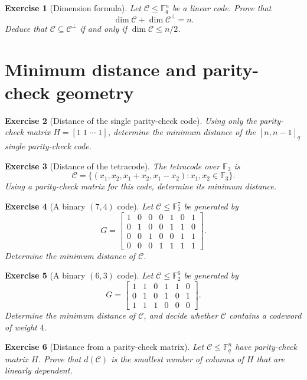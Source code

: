 \documentclass[11pt]{amsbook}
\theoremstyle{exstyle}
\newtheorem{exercise}{Exercise}
\theoremstyle{plain}
\newcommand{\F}{\mathbb{F}}
\newcommand{\Ccal}{\mathcal{C}}
\begin{document}
\begin{exercise}[Dimension formula]
Let $\Ccal\leq\F_q^n$ be a linear code. Prove that
\[
\dim \Ccal+\dim \Ccal^{\perp}=n.
\]
Deduce that $\Ccal\subseteq \Ccal^{\perp}$ if and only if $\dim \Ccal\leq n/2$.
\end{exercise}

\section{Minimum distance and parity-check geometry}

\begin{exercise}[Distance of the single parity-check code]
Using only the parity-check matrix $H=[1\;1\;\cdots\;1]$, determine the minimum distance of the $[n,n-1]_q$ single parity-check code.
\end{exercise}

\begin{exercise}[Distance of the tetracode]
The tetracode over $\F_3$ is
\[
\Ccal=\{(x_1,x_2,x_1+x_2,x_1-x_2):x_1,x_2\in\F_3\}.
\]
Using a parity-check matrix for this code, determine its minimum distance.
\end{exercise}

\begin{exercise}[A binary $(7,4)$ code]
Let $\Ccal\leq \F_2^7$ be generated by
\[
G=
\begin{bmatrix}
1&0&0&0&1&0&1\\
0&1&0&0&1&1&0\\
0&0&1&0&0&1&1\\
0&0&0&1&1&1&1
\end{bmatrix}.
\]
Determine the minimum distance of $\Ccal$.
\end{exercise}

\begin{exercise}[A binary $(6,3)$ code]
Let $\Ccal\leq\F_2^6$ be generated by
\[
G=
\begin{bmatrix}
1&1&0&1&1&0\\
0&1&0&1&0&1\\
1&1&1&0&0&0
\end{bmatrix}.
\]
Determine the minimum distance of $\Ccal$, and decide whether $\Ccal$ contains a codeword of weight $4$.
\end{exercise}

\begin{exercise}[Distance from a parity-check matrix]
Let $\Ccal\leq\F_q^n$ have parity-check matrix $H$. Prove that $d(\Ccal)$ is the smallest number of columns of $H$ that are linearly dependent.
\end{exercise}
\end{document}

